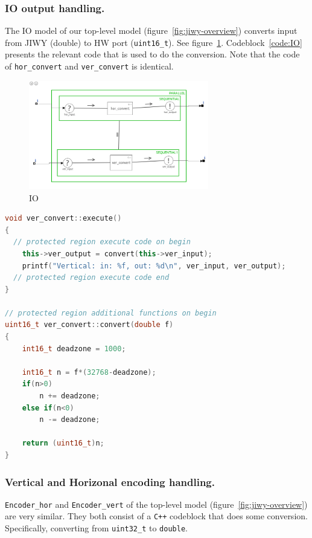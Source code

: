 \documentclass[a4paper,twoside,11pt]{article}
\newcommand{\cpp}{{\tt C++} }
\begin{document}
\subsubsection{IO output handling.}
The IO model of our top-level model (figure~\ref{fig:jiwy-overview}) converts input from JIWY (double) to HW port (\texttt{uint16\_t}). See figure~\ref{fig:jiwy-IO}.
Codeblock~\ref{code:IO} presents the relevant code that is used to do the conversion.
Note that the code of \texttt{hor\_convert} and \texttt{ver\_convert} is identical.
\begin{figure}[ht]
	\centering
	\includegraphics[width=0.7\textwidth]{./img/jiwy-IO.png}
	\caption{IO}
	\label{fig:jiwy-IO}
\end{figure}
\begin{lstlisting}[caption=Relevant code of the IO block, label=code:IO, language=C++]
void ver_convert::execute()
{
  // protected region execute code on begin
	this->ver_output = convert(this->ver_input);
	printf("Vertical: in: %f, out: %d\n", ver_input, ver_output);
  // protected region execute code end
}

// protected region additional functions on begin
uint16_t ver_convert::convert(double f)
{
	int16_t deadzone = 1000;

	int16_t n = f*(32768-deadzone);
	if(n>0)
		n += deadzone;
	else if(n<0)
		n -= deadzone;

	return (uint16_t)n;
}
\end{lstlisting}

\subsubsection{Vertical and Horizonal encoding handling.}
\texttt{Encoder\_hor} and \texttt{Encoder\_vert} of the top-level model (figure~\ref{fig:jiwy-overview}) are very similar. They both consist of a \cpp codeblock that does some conversion. 
Specifically, converting from \texttt{uint32\_t} to \texttt{double}. 
\end{document}
